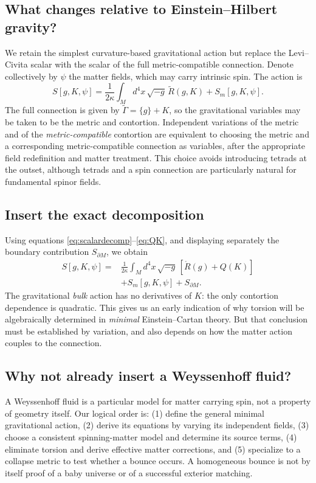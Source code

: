 \documentclass[11pt,a4paper]{article}
\newcommand{\RR}{\mathring{R}}
\begin{document}
\subsection{What changes relative to Einstein--Hilbert gravity?}
We retain the simplest curvature-based gravitational action but replace the Levi--Civita scalar with the scalar of the full metric-compatible connection. Denote collectively by $\psi$ the matter fields, which may carry intrinsic spin. The action is
\begin{equation}\label{eq:EC}
\boxed{S[g,K,\psi]=\frac{1}{2\kappa}\int_M d^4x\,\sqrt{-g}\,\widetilde R(g,K)+S_m[g,K,\psi].}
\end{equation}
The full connection is given by $\widetilde\Gamma=\{g\}+K$, so the gravitational variables may be taken to be the metric and contortion. Independent variations of the metric and of the \emph{metric-compatible} contortion are equivalent to choosing the metric and a corresponding metric-compatible connection as variables, after the appropriate field redefinition and matter treatment. This choice avoids introducing tetrads at the outset, although tetrads and a spin connection are particularly natural for fundamental spinor fields.

\subsection{Insert the exact decomposition}
Using equations \eqref{eq:scalardecomp}--\eqref{eq:QK}, and displaying separately the boundary contribution $S_{\partial M}$, we obtain
\begin{equation}\label{eq:ECbulk}
\boxed{\begin{aligned}
S[g,K,\psi]={}&\frac{1}{2\kappa}\int_M d^4x\,\sqrt{-g}\,\left[\RR(g)+Q(K)\right]\\
&+S_m[g,K,\psi]+S_{\partial M}.
\end{aligned}}
\end{equation}
The gravitational \emph{bulk} action has no derivatives of $K$: the only contortion dependence is quadratic. This gives us an early indication of why torsion will be algebraically determined in \emph{minimal} Einstein--Cartan theory. But that conclusion must be established by variation, and also depends on how the matter action couples to the connection.

\subsection{Why not already insert a Weyssenhoff fluid?}
A Weyssenhoff fluid is a particular model for matter carrying spin, not a property of geometry itself. Our logical order is: (1) define the general minimal gravitational action, (2) derive its equations by varying its independent fields, (3) choose a consistent spinning-matter model and determine its source terms, (4) eliminate torsion and derive effective matter corrections, and (5) specialize to a collapse metric to test whether a bounce occurs. A homogeneous bounce is not by itself proof of a baby universe or of a successful exterior matching.
\end{document}
